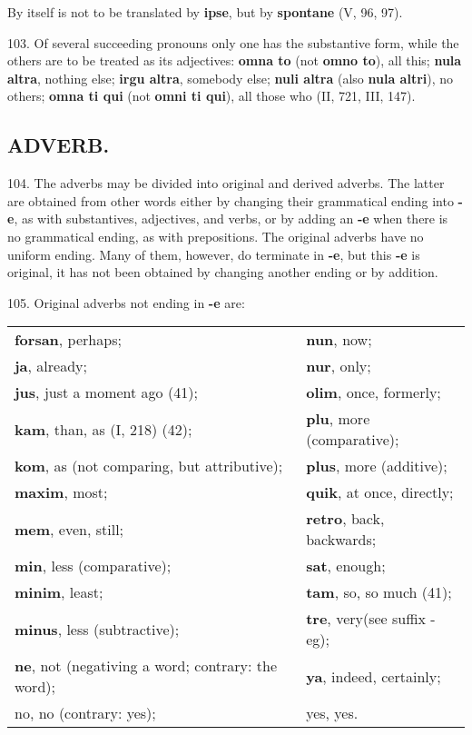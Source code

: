 By itself is not to be translated by \textbf{ipse}, but by \textbf{spontane} (V, 96, 97).

103. Of several succeeding pronouns only one has the substantive form, while the others are to be treated as its adjectives: \textbf{omna to} (not \textbf{omno to}), all this; \textbf{nula altra}, nothing else; \textbf{irgu altra}, somebody else; \textbf{nuli altra} (also \textbf{nula altri}), no others; \textbf{omna ti qui} (not \textbf{omni ti qui}), all those who (II, 721, III, 147).

\subsection*{ADVERB.}
104. The adverbs may be divided into original and derived adverbs. The latter are obtained from other words either by changing their grammatical ending into \textbf{-e}, as with substantives, adjectives, and verbs, or by adding an \textbf{-e} when there is no grammatical ending, as with prepositions. The original adverbs have no uniform ending. Many of them, however, do terminate in \textbf{-e}, but this \textbf{-e} is original, it has not been obtained by changing another ending or by addition.

105. Original adverbs not ending in \textbf{-e} are:

\begin{tabular}{l l}
\textbf{forsan}, perhaps; & \textbf{nun}, now; \\
\textbf{ja}, already; & \textbf{nur}, only; \\
\textbf{jus}, just a moment ago (41); & \textbf{olim}, once, formerly; \\
\textbf{kam}, than, as (I, 218) (42); & \textbf{plu}, more (comparative); \\
\textbf{kom}, as (not comparing, but attributive); & \textbf{plus}, more (additive); \\
\textbf{maxim}, most; & \textbf{quik}, at once, directly; \\
\textbf{mem}, even, still; & \textbf{retro}, back, backwards; \\
\textbf{min}, less (comparative); & \textbf{sat}, enough; \\
\textbf{minim}, least; & \textbf{tam}, so, so much (41); \\
\textbf{minus}, less (subtractive); & \textbf{tre}, very\footnotemark[1] (see suffix -eg); \\
\textbf{ne}, not (negativing a word; contrary: the word); & \textbf{ya}, indeed, certainly; \\
no, no (contrary: yes); & yes, yes.
\end{tabular}

